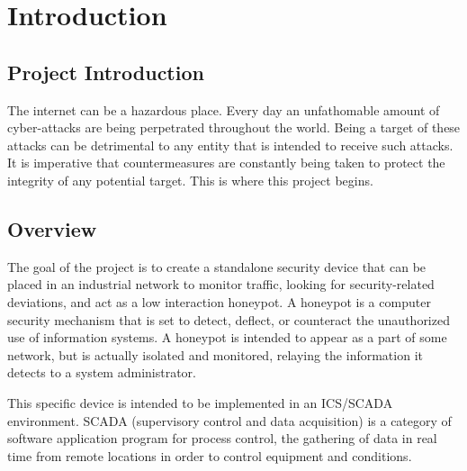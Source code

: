 \chapter{Introduction}

\section{Project Introduction}

The internet can be a hazardous place. Every day an unfathomable amount of cyber-attacks are being perpetrated throughout the world. Being a target of these attacks can be detrimental to any entity that is intended to receive such attacks. It is imperative that countermeasures are constantly being taken to protect the integrity of any potential target. This is where this project begins.


\section{Overview}
The goal of the project is to create a standalone security device that can be placed in an industrial network to monitor traffic, looking for security-related deviations, and act as a low interaction honeypot. A honeypot is a computer security mechanism that is set to detect, deflect, or counteract the unauthorized use of information systems. A honeypot is intended to appear as a part of some network, but is actually isolated and monitored, relaying the information it detects to a system administrator.

This specific device is intended to be implemented in an ICS/SCADA environment. SCADA (supervisory control and data acquisition) is a category of software application program for process control, the gathering of data in real time from remote locations in order to control equipment and conditions.

